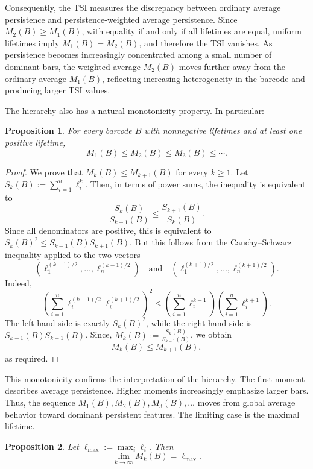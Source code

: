 \documentclass[11pt]{amsart}
\newtheorem{prop}{Proposition}[section]
\theoremstyle{definition}
\begin{document}
Consequently, the TSI measures the discrepancy between ordinary average persistence and persistence-weighted average persistence. Since \(M_2(B)\ge M_1(B)\), with equality if and only if all lifetimes are equal, uniform lifetimes imply \(M_1(B)=M_2(B)\), and therefore the TSI vanishes. As persistence becomes increasingly concentrated among a small number of dominant bars, the weighted average \(M_2(B)\) moves further away from the ordinary average \(M_1(B)\),
reflecting increasing heterogeneity in the barcode and producing larger TSI values.

\smallbreak 

The hierarchy also has a natural monotonicity property. In particular:

\begin{prop}
For every barcode \(B\) with nonnegative lifetimes and at least one positive lifetime,
\[
M_1(B)\leq M_2(B)\leq M_3(B)\leq \cdots .
\]
\end{prop}

\begin{proof}
We prove that \(M_k(B)\leq M_{k+1}(B)\) for every \(k\geq 1\). Let \(S_k(B):=\sum_{i=1}^{n}\ell_i^k\). Then, in terms of power sums, the inequality is equivalent to
\[
\frac{S_k(B)}{S_{k-1}(B)}
\leq
\frac{S_{k+1}(B)}{S_k(B)}.
\]
Since all denominators are positive, this is equivalent to \( S_k(B)^2 \leq S_{k-1}(B)S_{k+1}(B)\). But this follows from the Cauchy--Schwarz inequality applied to the two vectors
\[
\left(\ell_1^{(k-1)/2},\ldots,\ell_n^{(k-1)/2}\right) \quad \text{and} \quad \left(\ell_1^{(k+1)/2},\ldots,\ell_n^{(k+1)/2}\right).
\]
Indeed,
\[
\left(
\sum_{i=1}^{n}
\ell_i^{(k-1)/2}\ell_i^{(k+1)/2}
\right)^2
\leq
\left(
\sum_{i=1}^{n}\ell_i^{k-1}
\right)
\left(
\sum_{i=1}^{n}\ell_i^{k+1}
\right).
\]
The left-hand side is exactly \(S_k(B)^2\), while the right-hand side is \(S_{k-1}(B)S_{k+1}(B)\). Since, \(M_k(B):=\frac{S_k(B)}{S_{k-1}(B)}\), we obtain
\[
M_k(B)\leq M_{k+1}(B),
\]
as required.
\end{proof}

This monotonicity confirms the interpretation of the hierarchy. The first moment describes average persistence. Higher moments increasingly emphasize
larger bars. Thus, the sequence \(M_1(B),M_2(B),M_3(B),\ldots\) moves from global average behavior toward dominant persistent features. The limiting case is the maximal lifetime.

\begin{prop}
Let \(\ell_{\max}:=\max_i \ell_i\). Then
\[
\lim_{k\to\infty} M_k(B)=\ell_{\max}.
\]
\end{prop}
\end{document}
